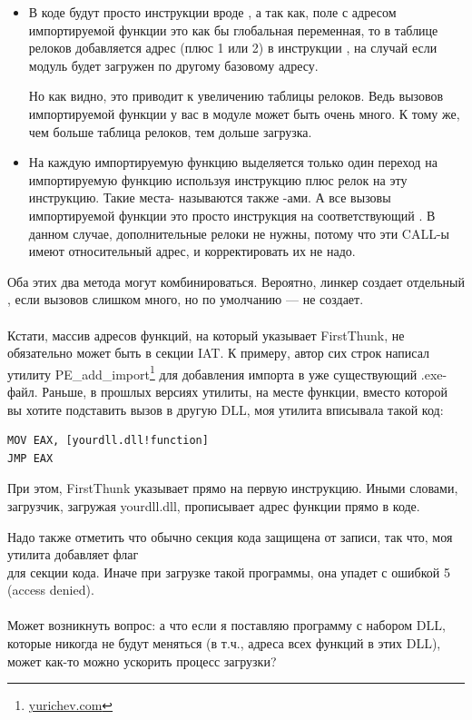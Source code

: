 \begin{itemize}
\item
В коде будут просто инструкции вроде , а так как, поле с адресом импортируемой функции это как бы глобальная переменная, 
то в таблице релоков добавляется адрес (плюс 1 или 2) в инструкции ,
на случай если модуль будет загружен по другому базовому адресу.

Но как видно, это приводит к увеличению таблицы релоков.
Ведь вызовов импортируемой функции у вас в модуле может быть очень много.
К тому же, чем больше таблица релоков, тем дольше загрузка.

\item
На каждую импортируемую функцию выделяется только один переход на импортируемую функцию используя
инструкцию \JMP плюс релок на эту инструкцию.
Такие места- называются также -ами.
А все вызовы импортируемой функции это просто инструкция \CALL на соответствующий .
В данном случае, дополнительные релоки не нужны, потому что эти CALL-ы имеют относительный адрес,
и корректировать их не надо.
\end{itemize}

Оба этих два метода могут комбинироваться.
Вероятно, линкер создает отдельный , если вызовов слишком много, но по умолчанию --- не создает. \\
\\
Кстати, массив адресов функций, на который указывает FirstThunk,
не обязательно может быть в секции \ac{IAT}.
К примеру, автор сих строк написал утилиту
PE\_add\_import\footnote{\href{http://go.yurichev.com/17049}{yurichev.com}} 
для добавления импорта в уже существующий .exe-файл.
Раньше, в прошлых версиях утилиты, на месте функции, вместо которой вы хотите подставить вызов в другую DLL,
моя утилита вписывала такой код:

\begin{lstlisting}
MOV EAX, [yourdll.dll!function]
JMP EAX
\end{lstlisting}

При этом, FirstThunk указывает прямо на первую инструкцию.
Иными словами, загрузчик, загружая yourdll.dll, прописывает адрес функции  прямо в коде.

Надо также отметить что обычно секция кода защищена от записи, так что, моя утилита добавляет флаг \\
для секции кода. Иначе при загрузке такой программы, она упадет с ошибкой 5 (access denied). \\
\\
Может возникнуть вопрос: а что если я поставляю программу с набором DLL,
которые никогда не будут меняться (в т.ч., адреса всех функций в этих DLL), может как-то можно ускорить процесс загрузки?

